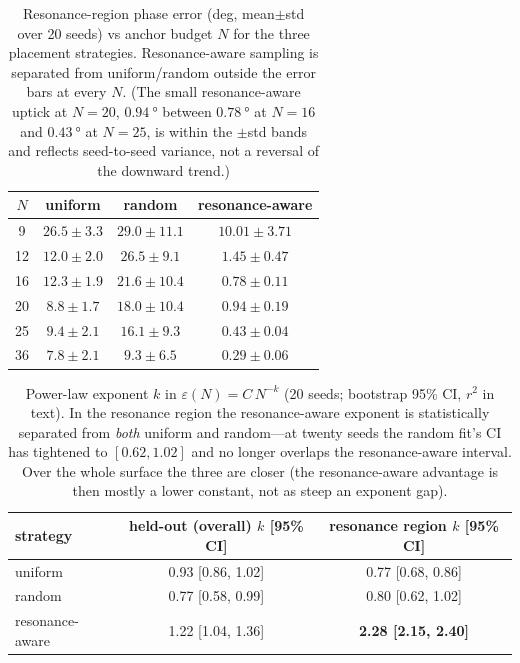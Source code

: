 \documentclass[11pt]{article}
\begin{document}
\begin{table}[!ht]\centering\small
\caption{Resonance-region phase error (deg, mean$\pm$std over 20 seeds) vs anchor budget $N$ for the three
placement strategies. Resonance-aware sampling is separated from uniform/random outside the error bars at
every $N$. (The small resonance-aware uptick at $N\!=\!20$, $\SI{0.94}{\degree}$ between $\SI{0.78}{\degree}$ at $N\!=\!16$
and $\SI{0.43}{\degree}$ at $N\!=\!25$, is within the $\pm$std bands and reflects seed-to-seed variance, not a reversal of the
downward trend.)}
\label{tab:dataeff}
\begin{tabular}{cccc}
\toprule
$N$ & uniform & random & resonance-aware \\
\midrule
9  & $26.5\pm3.3$  & $29.0\pm11.1$ & $\mathbf{10.01\pm3.71}$ \\
12 & $12.0\pm2.0$  & $26.5\pm9.1$  & $\mathbf{1.45\pm0.47}$ \\
16 & $12.3\pm1.9$  & $21.6\pm10.4$ & $\mathbf{0.78\pm0.11}$ \\
20 & $8.8\pm1.7$   & $18.0\pm10.4$ & $\mathbf{0.94\pm0.19}$ \\
25 & $9.4\pm2.1$   & $16.1\pm9.3$  & $\mathbf{0.43\pm0.04}$ \\
36 & $7.8\pm2.1$   & $9.3\pm6.5$   & $\mathbf{0.29\pm0.06}$ \\
\bottomrule
\end{tabular}
\end{table}

\begin{table}[!ht]\centering\small
\caption{Power-law exponent $k$ in $\varepsilon(N)=C\,N^{-k}$ (20 seeds; bootstrap 95\% CI, $r^2$ in text). In the
resonance region the resonance-aware exponent is statistically separated from \emph{both} uniform and
random---at twenty seeds the random fit's CI has tightened to $[0.62,1.02]$ and no longer overlaps the
resonance-aware interval. Over the whole surface the three are closer (the resonance-aware advantage is then
mostly a lower constant, not as steep an exponent gap).}
\label{tab:scaling}
\begin{tabular}{lcc}
\toprule
strategy & held-out (overall) $k$ [95\% CI] & resonance region $k$ [95\% CI] \\
\midrule
uniform        & 0.93 [0.86, 1.02] & 0.77 [0.68, 0.86] \\
random         & 0.77 [0.58, 0.99] & 0.80 [0.62, 1.02] \\
resonance-aware& 1.22 [1.04, 1.36] & \textbf{2.28 [2.15, 2.40]} \\
\bottomrule
\end{tabular}
\end{table}
\end{document}
